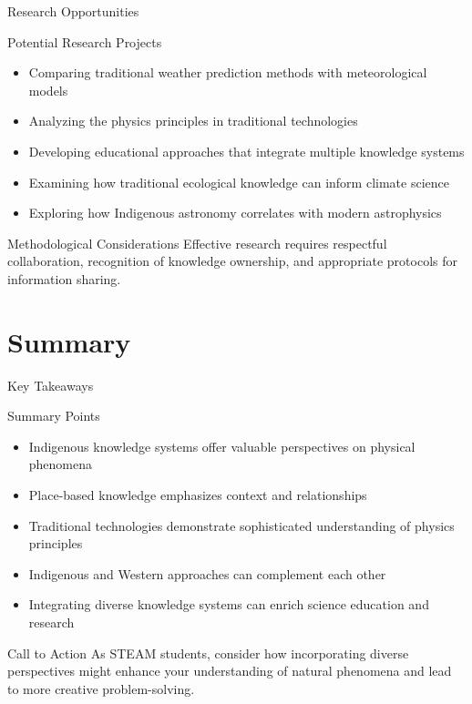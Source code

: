 \documentclass{beamer}
\begin{document}
\begin{frame}{Research Opportunities}
    \begin{block}{Potential Research Projects}
        \begin{itemize}
            \item Comparing traditional weather prediction methods with meteorological models
            \item Analyzing the physics principles in traditional technologies
            \item Developing educational approaches that integrate multiple knowledge systems
            \item Examining how traditional ecological knowledge can inform climate science
            \item Exploring how Indigenous astronomy correlates with modern astrophysics
        \end{itemize}
    \end{block}
    
    \begin{alertblock}{Methodological Considerations}
        Effective research requires respectful collaboration, recognition of knowledge ownership, and appropriate protocols for information sharing.
    \end{alertblock}
\end{frame}

\section{Summary}

\begin{frame}{Key Takeaways}
    \begin{block}{Summary Points}
        \begin{itemize}
            \item Indigenous knowledge systems offer valuable perspectives on physical phenomena
            \item Place-based knowledge emphasizes context and relationships
            \item Traditional technologies demonstrate sophisticated understanding of physics principles
            \item Indigenous and Western approaches can complement each other
            \item Integrating diverse knowledge systems can enrich science education and research
        \end{itemize}
    \end{block}
    
    \begin{alertblock}{Call to Action}
        As STEAM students, consider how incorporating diverse perspectives might enhance your understanding of natural phenomena and lead to more creative problem-solving.
    \end{alertblock}
\end{frame}
\end{document}
